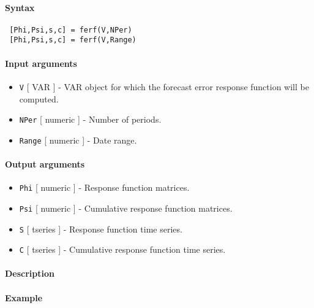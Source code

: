 


	\paragraph{Syntax}
 
 \begin{verbatim}
 [Phi,Psi,s,c] = ferf(V,NPer)
 [Phi,Psi,s,c] = ferf(V,Range)
 \end{verbatim}
 
 \paragraph{Input arguments}
 
 \begin{itemize}
 \item
   \texttt{V} {[} VAR {]} - VAR object for which the forecast error
   response function will be computed.
 \item
   \texttt{NPer} {[} numeric {]} - Number of periods.
 \item
   \texttt{Range} {[} numeric {]} - Date range.
 \end{itemize}
 
 \paragraph{Output arguments}
 
 \begin{itemize}
 \item
   \texttt{Phi} {[} numeric {]} - Response function matrices.
 \item
   \texttt{Psi} {[} numeric {]} - Cumulative response function matrices.
 \item
   \texttt{S} {[} tseries {]} - Response function time series.
 \item
   \texttt{C} {[} tseries {]} - Cumulative response function time series.
 \end{itemize}
 
 \paragraph{Description}
 
 \paragraph{Example}


